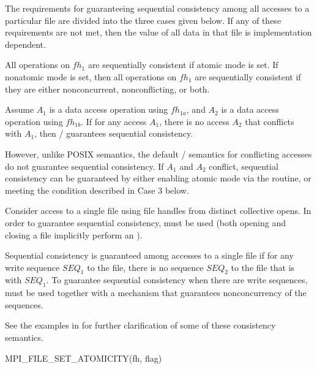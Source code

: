 The requirements for guaranteeing sequential consistency among all
accesses to a particular file are divided into the three cases given
below.  If any of these requirements are not met, then the value of
all data in that file is implementation dependent.

All operations on $fh_1$ are sequentially consistent if atomic mode
is set.  If nonatomic mode is set, then all operations on $fh_1$ 
are sequentially consistent if they are either nonconcurrent, nonconflicting,
or both.

Assume $A_1$ is a data access operation using $fh_{1a}$,
and    $A_2$ is a data access operation using $fh_{1b}$.
If for any access $A_1$, there is no access $A_2$ that conflicts
with $A_1$, then \MPI/ guarantees sequential consistency.

However, unlike POSIX semantics, the default \MPI/ semantics
for conflicting accesses
do not guarantee sequential consistency.
If $A_1$ and $A_2$ conflict,
sequential consistency can be guaranteed by either
enabling atomic mode via the  routine, or
meeting the 
condition
described in Case 3 below.

Consider access to a single file using file handles from distinct
collective opens.
In order to guarantee sequential consistency, 
must be used (both opening and closing a file implicitly perform an
).

Sequential consistency is guaranteed among accesses to a single file if
for any write sequence $SEQ_1$ to the file,
there is no sequence $SEQ_2$ to the file that
is  with
$SEQ_1$.
To guarantee sequential consistency when there are write sequences,
 must be used
together with a mechanism that guarantees nonconcurrency of the sequences.

See the examples in  for
further clarification of some of these consistency semantics.


%
\begin{funcdef}{MPI\_FILE\_SET\_ATOMICITY}{(\mbox{fh}, \mbox{flag})}
\end{funcdef}

